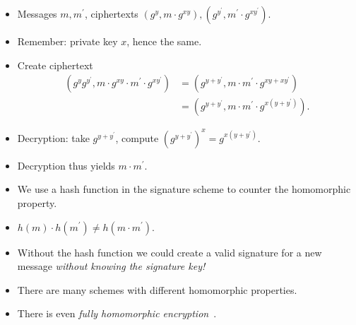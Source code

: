 \begin{frame}
  \begin{example}
    \begin{itemize}
      \item Messages \(m, m^\prime\), ciphertexts \((g^y, m\cdot g^{xy}), 
          (g^{y^\prime}, m^\prime\cdot g^{x y^\prime})\).

      \item Remember: private key \(x\), hence the same.

        \pause{}

      \item Create ciphertext
        \begin{align*}
          (g^y g^{y^\prime}, m\cdot g^{xy}\cdot m^\prime\cdot g^{x y^\prime})
          &= (g^{y + y^\prime}, m\cdot m^\prime\cdot g^{xy + xy^\prime}) \\
          &= (g^{y + y^\prime}, m\cdot m^\prime\cdot g^{x(y + y^\prime)}).
        \end{align*}

        \pause{}

      \item Decryption: take \(g^{y + y^\prime}\), compute \((g^{y+y^\prime})^x 
          = g^{x(y + y^\prime)}\).

      \item Decryption thus yields \(m\cdot m^\prime\).

    \end{itemize}
  \end{example}
\end{frame}

\begin{frame}
  \begin{remark}
    \begin{itemize}
      \item We use a hash function in the signature scheme to counter the 
        homomorphic property.

      \item \(h(m)\cdot h(m^\prime)\neq h(m\cdot m^\prime)\).

        \pause{}

      \item Without the hash function we could create a valid signature for 
        a new message \emph{without knowing the signature key!}
    \end{itemize}
  \end{remark}
\end{frame}

\begin{frame}
  \begin{remark}
    \begin{itemize}
      \item There are many schemes with different homomorphic properties.
      \item There is even \emph{fully homomorphic 
          encryption}~\cite{GentryFullyHomomorphicEncryption}.
    \end{itemize}
  \end{remark}
\end{frame}



